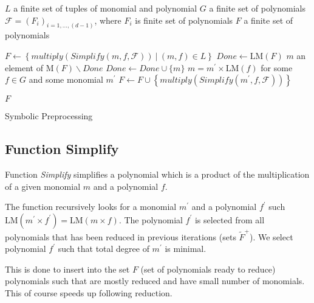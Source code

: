 \begin{algorithm}[ht]
  \begin{algorithmic}[1]
    \Require
      \Statex $L$ a finite set of tuples of monomial and polynomial
      \Statex $G$ a finite set of polynomials
      \Statex $\mathcal{F} = (F_i)_{i=1,\ldots,(d-1)}$, where $F_i$ is finite set of polynomials
    \Ensure
      \Statex $F$ a finite set of polynomials
      \Statex

    \State $F \gets \left\{multiply(Simplify(m, f, \mathcal{F}))\ |\ (m, f)\in L\right\}$
    \State $Done \gets \textrm{LM}(F)$
      \State $m$ an element of $\textrm{M}(F)\backslash Done$
      \State $Done \gets Done \cup \{m\}$
        \State $m = m^\prime \times \textrm{LM}(f)$ for some $f \in G$ and some monomial $m^\prime$
        \State $F \gets F \cup \left\{multiply(Simplify(m^\prime, f, \mathcal{F}))\right\}$
      \EndIf
    \EndWhile

    \State \Return $F$

  \end{algorithmic}
  \caption{Symbolic Preprocessing}
\end{algorithm}

\subsection{Function Simplify}
Function \textit{Simplify} simplifies a polynomial which is a product of the multiplication of a given monomial $m$ and a polynomial $f$.

The function recursively looks for a monomial $m^\prime$ and a polynomial $f^\prime$ such $\textrm{LM}(m^\prime\times f^\prime) = \textrm{LM}(m\times f)$. The polynomial $f^\prime$ is selected from all polynomials that has been reduced in previous iterations (sets $\tilde{F}^+$). We select polynomial $f^\prime$ such that total degree of $m^\prime$ is minimal.

This is done to insert into the set $F$ (set of polynomials ready to reduce) polynomials such that are mostly reduced and have small number of monomials. This of course speeds up following reduction.

